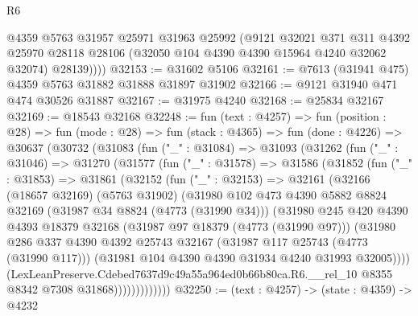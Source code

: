 \begin{lexlean}{R6}
\begin{coremodule}
          @4359
          @5763
          @31957
          @25971
          @31963
          @25992
          (@9121
            @32021
            @371
            @311
            @4392
            @25970
            @28118
            @28106
            (@32050 @104 @4390 @4390 @15964 @4240 @32062 @32074)
            @28139))))
@32153 := @31602 @5106
@32161 := @7613 (@31941 @475) @4359 @5763 @31882 @31888 @31897 @31902
@32166 := @9121 @31940 @471 @474 @30526 @31887
@32167 := @31975 @4240
@32168 := @25834 @32167
@32169 := @18543 @32168
@32248 := fun (text : @4257) =>
  fun (position : @28) =>
  fun (mode : @28) =>
  fun (stack : @4365) =>
  fun (done : @4226) =>
  @30637
    (@30732
      (@31083
        (fun ("_" : @31084) =>
        @31093
          (@31262
            (fun ("_" : @31046) =>
            @31270
              (@31577
                (fun ("_" : @31578) =>
                @31586
                  (@31852
                    (fun ("_" : @31853) =>
                    @31861
                      (@32152
                        (fun ("_" : @32153) =>
                        @32161
                          (@32166
                            (@18657 @32169)
                            (@5763 @31902)
                            (@31980
                              @102
                              @473
                              @4390
                              @5882
                              @8824
                              @32169
                              (@31987 @34 @8824 (@4773 (@31990 @34)))
                              (@31980
                                @245
                                @420
                                @4390
                                @4393
                                @18379
                                @32168
                                (@31987 @97 @18379 (@4773 (@31990 @97)))
                                (@31980
                                  @286
                                  @337
                                  @4390
                                  @4392
                                  @25743
                                  @32167
                                  (@31987 @117 @25743 (@4773 (@31990 @117)))
                                  (@31981 @104 @4390 @4390 @31934 @4240 @31993 @32005))))
                            (LexLeanPreserve.Cdebed7637d9c49a55a964ed0b66b80ca.R6.__rel_10
                              @8355
                              @8342
                              @7308
                              @31868)))))))))))))
@32250 := (text : @4257) -> (state : @4359) -> @4232

\end{coremodule}
\end{lexlean}
